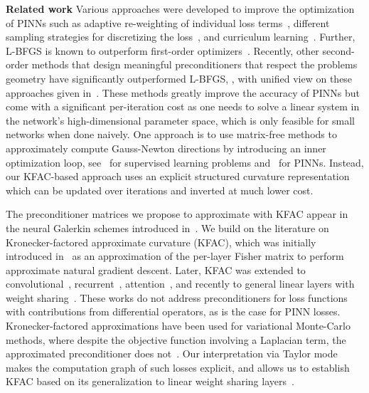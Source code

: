 \textbf{Related work}
Various approaches were developed to improve the optimization of PINNs such as adaptive re-weighting of individual loss terms~\citep{wang2021understanding,van2022optimally,wang2022and}, different sampling strategies for discretizing the loss~\citep{lu2021deepxde, nabian2021efficient, daw2022rethinking,zapf2022investigating, wang2022respecting, wu2023comprehensive}, and curriculum learning~\citep{krishnapriyan2021characterizing, wang2022respecting}.
Further, L-BFGS is known to outperform first-order optimizers~\citep{markidis2021old}.
Recently, other second-order methods that design meaningful preconditioners that respect the problems geometry have significantly outperformed L-BFGS, \cite[see][]{zeng2022competitive, muller2023achieving, de2023operator, liu2024preconditioning, jnini2024gauss,chen2024teng, zampini2024petscml}, with unified view on these approaches given in~\citet{muller2024optimization}.
These methods greatly improve the accuracy of PINNs but come with a significant per-iteration cost as one needs to solve a linear system in the network's high-dimensional parameter space, which is only feasible for small networks when done naively.
One approach is to use matrix-free methods to approximately compute Gauss-Newton directions by introducing an inner optimization loop, see~\cite{schraudolph2002fast,martens2010deep} for supervised learning problems and~\cite{zeng2022competitive,bonfanti2024challenges, jnini2024gauss,zampini2024petscml} for PINNs.
Instead, our KFAC-based approach uses an explicit structured curvature representation which can be updated over iterations and inverted at much lower cost.

The preconditioner matrices we propose to approximate with KFAC appear in the neural Galerkin schemes introduced in~\citet{bruna2024neural}.
We build on the literature on Kronecker-factored approximate curvature (KFAC), which was initially introduced in~\citet{heskes2000natural,martens2010deep} as an approximation of the per-layer Fisher matrix to perform approximate natural gradient descent.
Later, KFAC was extended to convolutional~\citep{grosse2016kroneckerfactored}, recurrent~\citep{martens2018kroneckerfactored}, attention~\citep{zhang2019algorithmic,pauloski2021kaisa,osawa2023pipefisher,grosse2023studying}, and recently to general linear layers with weight sharing~\cite{eschenhagen2023kroneckerfactored}.
These works do not address preconditioners for loss functions with contributions from differential operators, as is the case for PINN losses.
Kronecker-factored approximations have been used for variational Monte-Carlo methods, where despite the objective function involving a Laplacian term, the approximated preconditioner does not~\citep{pfau2020ab,drissi2024second}.
Our interpretation via Taylor mode makes the computation graph of such losses explicit, and allows us to establish KFAC based on its generalization to linear weight sharing layers~\cite{eschenhagen2023kroneckerfactored}.

